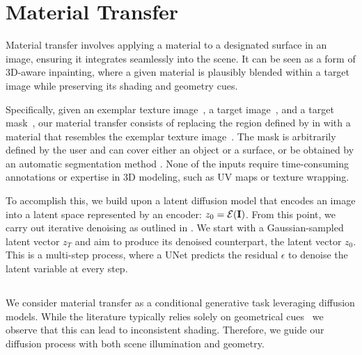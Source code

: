 
\section{Material Transfer}


Material transfer involves applying a material to a designated surface in an image, ensuring it integrates seamlessly into the scene.
It can be seen as a form of 3D-aware inpainting, where a given material is plausibly blended within a target image while preserving its shading and geometry cues. 

Specifically, given an exemplar texture image~\exemplar, a target image~\target, and a target mask~\mask, our material transfer consists of replacing the region defined by \mask in \target with a material that resembles the exemplar texture image~\exemplar. 
The mask is arbitrarily defined by the user and can cover either an object or a surface, or be obtained by an automatic segmentation method \cite{kirillov2023segment,sharma2023materialistic}. None of the inputs require time-consuming annotations or expertise in 3D modeling, such as UV maps or texture wrapping. 

To accomplish this, we build upon a latent diffusion model that encodes an image \image into a latent space represented by an encoder: $z_0 = \mathcal{E}(\mathbf{I})$. From this point, we carry out iterative denoising as outlined in \cite{ho2020denoising}. 
We start with a Gaussian-sampled latent vector $z_T$ and aim to produce its denoised counterpart, the latent vector $z_0$. This is a multi-step process, where a UNet predicts the residual $\epsilon$ to denoise the latent variable at every step. 



\subsection{\method}
\label{sec:meth_meth}
We consider material transfer as a conditional generative task leveraging diffusion models. 
While the literature typically relies solely on geometrical cues~\cite{zhang2023controlnet,cheng2024zest} we observe that this can lead to inconsistent shading. Therefore, we guide our diffusion process with both scene illumination and geometry. 

